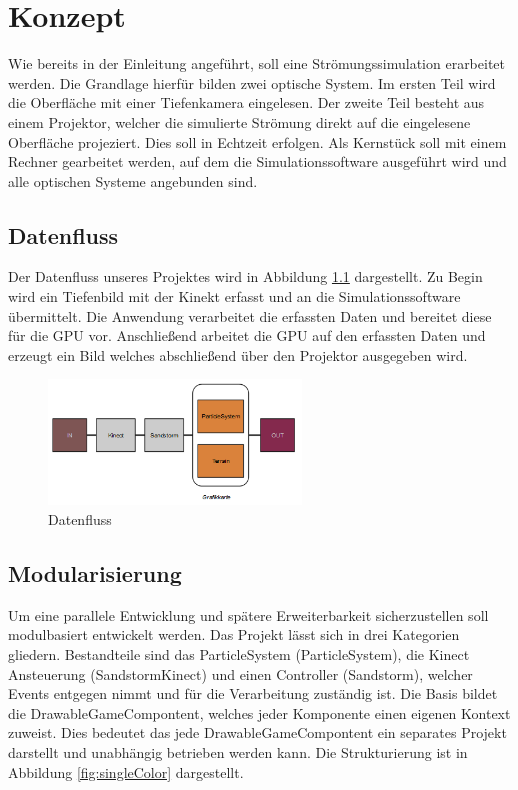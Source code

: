 \chapter{Konzept}
\begin{Spacing}{\mylinespace}

Wie bereits in der Einleitung angeführt, soll eine Strömungssimulation erarbeitet werden. Die Grandlage hierfür bilden zwei optische System. Im ersten Teil wird die Oberfläche mit einer Tiefenkamera eingelesen. Der zweite Teil besteht aus einem Projektor, welcher die simulierte Strömung direkt auf die eingelesene Oberfläche projeziert. Dies soll in Echtzeit erfolgen. Als Kernstück soll mit einem Rechner gearbeitet werden, auf dem die Simulationssoftware ausgeführt wird und alle optischen Systeme angebunden sind.

\section{Datenfluss}
Der Datenfluss unseres Projektes  wird in Abbildung \ref{fig:dataFlow} dargestellt. Zu Begin wird ein Tiefenbild mit der Kinekt erfasst und an die Simulationssoftware übermittelt. Die Anwendung verarbeitet die erfassten Daten und bereitet diese für die GPU vor. Anschließend arbeitet die GPU auf den erfassten Daten und erzeugt ein Bild welches abschließend über den Projektor ausgegeben wird.

\begin{figure}[h!]
	\centering
	\vspace*{20px}
	\includegraphics[width=0.6\textwidth]{graphics/flow.png}
	\caption{Datenfluss}
	\label{fig:dataFlow}
\end{figure}

\section{Modularisierung}
Um eine parallele Entwicklung und spätere Erweiterbarkeit sicherzustellen soll modulbasiert entwickelt werden. Das Projekt lässt sich in drei Kategorien gliedern. Bestandteile sind das ParticleSystem (ParticleSystem), die Kinect Ansteuerung (SandstormKinect) und einen Controller (Sandstorm), welcher Events entgegen nimmt und für die Verarbeitung zuständig ist. Die Basis bildet die DrawableGameCompontent, welches jeder Komponente einen eigenen Kontext zuweist. Dies bedeutet das jede DrawableGameCompontent ein separates Projekt darstellt und unabhängig betrieben werden kann. Die Strukturierung ist in Abbildung \ref{fig:singleColor} dargestellt.


\end{Spacing}
